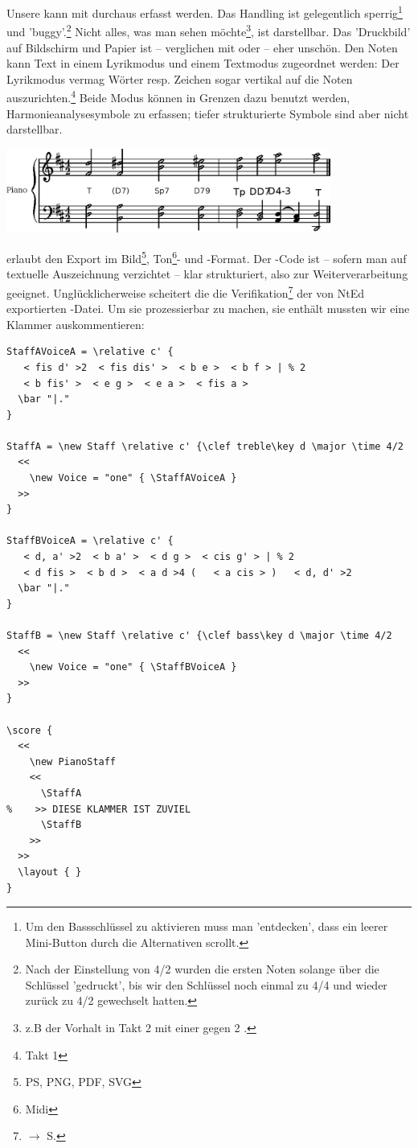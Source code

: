 Unsere  kann mit  durchaus erfasst werden. Das
Handling ist gelegentlich sperrig\footnote{Um den Bassschlüssel zu aktivieren
muss man 'entdecken', dass ein leerer Mini-Button durch die Alternativen
scrollt.} und 'buggy'.\footnote{Nach der Einstellung von 4/2 wurden die ersten
Noten solange über die Schlüssel 'gedruckt', bis wir den Schlüssel noch einmal
zu 4/4 und wieder zurück zu 4/2 gewechselt hatten.} Nicht alles, was man sehen
möchte\footnote{z.B der Vorhalt in Takt 2 mit einer \Halb gegen 2 \Vier.}, ist
darstellbar. Das 'Druckbild' auf Bildschirm und Papier ist -- verglichen mit
 oder  -- eher unschön. Den Noten kann Text in
einem Lyrikmodus und einem Textmodus zugeordnet werden: Der Lyrikmodus vermag
Wörter resp. Zeichen sogar vertikal auf die Noten auszurichten.\footnote{Takt 1}
Beide Modus können in Grenzen dazu benutzt werden, Harmonieanalysesymbole zu
erfassen; tiefer strukturierte Symbole sind aber nicht darstellbar.

\begin{center}
\includegraphics[width=0.8\textwidth]{frontends/nted/candenca2-ntd}
\end{center}

 erlaubt den Export im Bild\footnote{PS, PNG, PDF, SVG},
Ton\footnote{Midi}- und -Format. Der -Code ist --
sofern man auf textuelle Auszeichnung verzichtet -- klar strukturiert, also zur
Weiterverarbeitung geeignet. Unglücklicherweise scheitert die die
Verifikation\footnote{$\rightarrow$ S.\pageref{ExportVerifikation}} der von NtEd
exportierten -Datei. Um sie prozessierbar zu machen, sie enthält
mussten wir eine Klammer auskommentieren:

\begin{verbatim}
StaffAVoiceA = \relative c' {
   < fis d' >2  < fis dis' >  < b e >  < b f > | % 2
   < b fis' >  < e g >  < e a >  < fis a > 
  \bar "|."
}

StaffA = \new Staff \relative c' {\clef treble\key d \major \time 4/2
  <<
    \new Voice = "one" { \StaffAVoiceA } 
  >>
}

StaffBVoiceA = \relative c' {
   < d, a' >2  < b a' >  < d g >  < cis g' > | % 2
   < d fis >  < b d >  < a d >4 (   < a cis > )   < d, d' >2 
  \bar "|."
}

StaffB = \new Staff \relative c' {\clef bass\key d \major \time 4/2
  <<
    \new Voice = "one" { \StaffBVoiceA } 
  >>
}

\score {
  <<
    \new PianoStaff 
    <<
      \StaffA
%    >> DIESE KLAMMER IST ZUVIEL
      \StaffB
    >>
  >>
  \layout { }
}
\end{verbatim}


